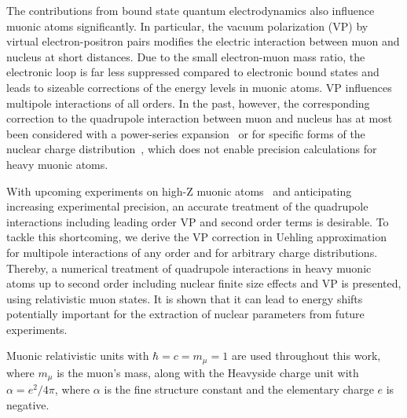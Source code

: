 The contributions from bound state quantum electrodynamics also influence muonic atoms significantly. In particular, the vacuum polarization (VP) by virtual electron-positron pairs modifies the electric interaction between muon and nucleus at short distances. Due to the small electron-muon mass ratio, the electronic loop is far less suppressed compared to electronic bound states and leads to sizeable corrections of the energy levels in muonic atoms. VP influences multipole interactions of all orders. In the past, however, the corresponding correction to the quadrupole interaction between muon and nucleus has at most been considered with a power-series expansion~\cite{Fricke1969vp,zehnder1975} or for specific forms of the nuclear charge distribution~\cite{pearson1963}, which does not enable precision calculations for heavy muonic atoms.

With upcoming experiments on high-Z muonic atoms~\cite{kirch2016} and anticipating increasing experimental precision, an accurate treatment of the quadrupole interactions including leading order VP and second order terms is desirable. To tackle this shortcoming, we derive the VP correction in Uehling approximation for multipole interactions of any order and for arbitrary charge distributions. Thereby, a numerical treatment of quadrupole interactions in heavy muonic atoms up to second order including nuclear finite size effects and VP is presented, using relativistic muon states. It is shown that it can lead to energy shifts potentially important for the extraction of nuclear parameters from future experiments.

Muonic relativistic units with ${\hbar}{=}{c}{=}{m_\mu}{=}{1}$ are used throughout this work, where $m_\mu$ is the muon's mass, along with the Heavyside charge unit with ${\alpha}{=}{e^2}{/}{4\pi}$, where $\alpha$ is the fine structure constant and the elementary charge $e$ is negative.\\

%
%
